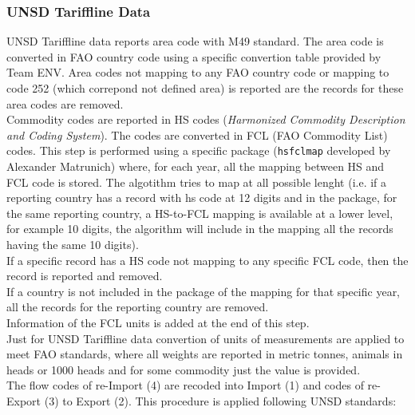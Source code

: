 \documentclass[nojss]{jss}\usepackage[]{graphicx}\usepackage[]{color}
\begin{document}
\subsubsection{UNSD Tariffline Data}
UNSD Tariffline data reports area code with M49 standard. The area code is converted in FAO country code using a specific convertion table provided by Team ENV. Area codes not mapping to any FAO country code or mapping to code 252 (which correpond not defined area) is reported are the records for these area codes are removed.\\
Commodity codes are reported in HS codes ({\it Harmonized Commodity Description and Coding System}). The codes are converted in FCL (FAO Commodity List) codes. This step is performed using a specific package ({\tt hsfclmap} developed by Alexander Matrunich) where, for each year, all the mapping between HS and FCL code is stored. The algotithm tries to map at all possible lenght (i.e. if a reporting country has a record with hs code at 12 digits and in the package, for the same reporting country, a HS-to-FCL mapping is available at a lower level, for example 10 digits, the algorithm will include in the mapping all the records having the same 10 digits).\\
If a specific record has a HS code not mapping to any specific FCL code, then the record is reported and removed.\\
If a country is not included in the package of the mapping for that specific year, all the records for the reporting country are removed.\\
Information of the FCL units is added at the end of this step.\\
Just for UNSD Tariffline data convertion of units of measurements are applied to meet FAO standards, where all weights are reported in metric tonnes, animals in heads or 1000 heads and for some commodity just the value is provided.\\
The flow codes of re-Import (4) are recoded into Import (1) and codes of re-Export (3) to Export (2). This procedure is applied following UNSD standards:
\end{document}
